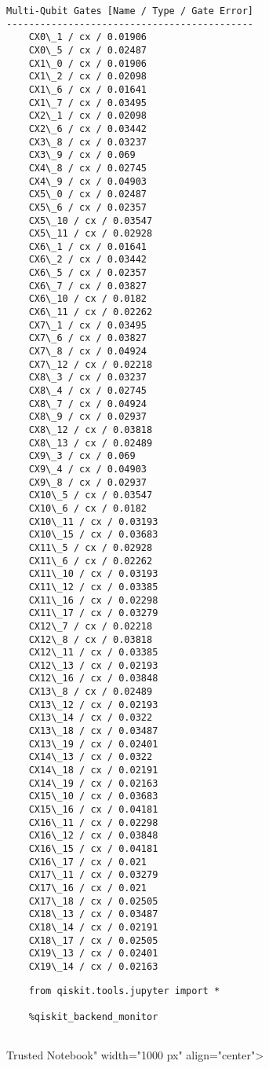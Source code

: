 \documentclass[11pt]{article}
\begin{document}
\begin{Verbatim}[commandchars=\\\{\}]
Multi-Qubit Gates [Name / Type / Gate Error]
--------------------------------------------
    CX0\_1 / cx / 0.01906
    CX0\_5 / cx / 0.02487
    CX1\_0 / cx / 0.01906
    CX1\_2 / cx / 0.02098
    CX1\_6 / cx / 0.01641
    CX1\_7 / cx / 0.03495
    CX2\_1 / cx / 0.02098
    CX2\_6 / cx / 0.03442
    CX3\_8 / cx / 0.03237
    CX3\_9 / cx / 0.069
    CX4\_8 / cx / 0.02745
    CX4\_9 / cx / 0.04903
    CX5\_0 / cx / 0.02487
    CX5\_6 / cx / 0.02357
    CX5\_10 / cx / 0.03547
    CX5\_11 / cx / 0.02928
    CX6\_1 / cx / 0.01641
    CX6\_2 / cx / 0.03442
    CX6\_5 / cx / 0.02357
    CX6\_7 / cx / 0.03827
    CX6\_10 / cx / 0.0182
    CX6\_11 / cx / 0.02262
    CX7\_1 / cx / 0.03495
    CX7\_6 / cx / 0.03827
    CX7\_8 / cx / 0.04924
    CX7\_12 / cx / 0.02218
    CX8\_3 / cx / 0.03237
    CX8\_4 / cx / 0.02745
    CX8\_7 / cx / 0.04924
    CX8\_9 / cx / 0.02937
    CX8\_12 / cx / 0.03818
    CX8\_13 / cx / 0.02489
    CX9\_3 / cx / 0.069
    CX9\_4 / cx / 0.04903
    CX9\_8 / cx / 0.02937
    CX10\_5 / cx / 0.03547
    CX10\_6 / cx / 0.0182
    CX10\_11 / cx / 0.03193
    CX10\_15 / cx / 0.03683
    CX11\_5 / cx / 0.02928
    CX11\_6 / cx / 0.02262
    CX11\_10 / cx / 0.03193
    CX11\_12 / cx / 0.03385
    CX11\_16 / cx / 0.02298
    CX11\_17 / cx / 0.03279
    CX12\_7 / cx / 0.02218
    CX12\_8 / cx / 0.03818
    CX12\_11 / cx / 0.03385
    CX12\_13 / cx / 0.02193
    CX12\_16 / cx / 0.03848
    CX13\_8 / cx / 0.02489
    CX13\_12 / cx / 0.02193
    CX13\_14 / cx / 0.0322
    CX13\_18 / cx / 0.03487
    CX13\_19 / cx / 0.02401
    CX14\_13 / cx / 0.0322
    CX14\_18 / cx / 0.02191
    CX14\_19 / cx / 0.02163
    CX15\_10 / cx / 0.03683
    CX15\_16 / cx / 0.04181
    CX16\_11 / cx / 0.02298
    CX16\_12 / cx / 0.03848
    CX16\_15 / cx / 0.04181
    CX16\_17 / cx / 0.021
    CX17\_11 / cx / 0.03279
    CX17\_16 / cx / 0.021
    CX17\_18 / cx / 0.02505
    CX18\_13 / cx / 0.03487
    CX18\_14 / cx / 0.02191
    CX18\_17 / cx / 0.02505
    CX19\_13 / cx / 0.02401
    CX19\_14 / cx / 0.02163

    \end{Verbatim}

    \begin{verbatim}
    from qiskit.tools.jupyter import *

    %qiskit_backend_monitor
    
\end{verbatim}

 Trusted Notebook" width="1000 px" align="center"\textgreater{}
\end{document}
